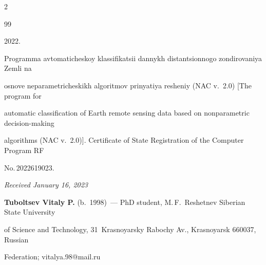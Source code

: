 \begin{multicols}{2}
{{\begin{thebibliography}{99}


 2022. 


Programma avtomaticheskoy klassifikatsii dannykh distantsionnogo zondirovaniya Zemli na 


osnove neparametricheskikh algoritmov prinyatiya resheniy (NAC v.~2.0) [The program for 


automatic classification of Earth remote sensing data based on nonparametric decision-making 


algorithms (NAC v.~2.0)]. Certificate of State Registration of the Computer Program RF 


No.\,2022619023.





\end{thebibliography}





 }


 }





\end{multicols}





\vspace*{-6pt}





\hfill{\small\textit{Received January 16, 2023}} 










\Contr





\vspace*{-4pt}





     \noindent


     \textbf{Tuboltsev Vitaly P.} (b.\ 1998)~--- PhD student, M.\,F.~Reshetnev Siberian State University 


of Science and Technology, 31~Krasnoyarsky Rabochy Av., Krasnoyarsk 660037, Russian 


Federation; \mbox{vitalya.98@mail.ru}


